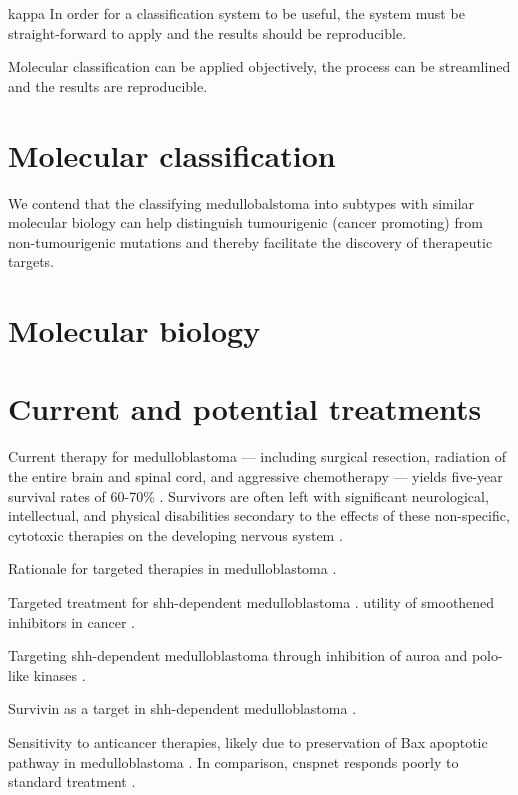 kappa
In order for a classification system to be useful, the system must be straight-forward to apply and the results should be reproducible.

Molecular classification can be applied objectively, the process can be streamlined and the results are reproducible.

\section{Molecular classification}

We contend that the classifying medullobalstoma into subtypes with similar molecular biology can help distinguish tumourigenic (cancer promoting) from non-tumourigenic mutations and thereby facilitate the discovery of therapeutic targets. 

\section{Molecular biology}


\section{Current and potential treatments}

Current therapy for medulloblastoma --- including surgical resection, radiation of the entire brain and spinal cord, and aggressive chemotherapy --- yields five-year survival rates of 60-70\% . Survivors are often left with significant neurological, intellectual, and physical disabilities secondary to the effects of these non-specific, cytotoxic therapies on the developing nervous system .

Rationale for targeted therapies in medulloblastoma .

Targeted treatment for \gls{shh}-dependent medulloblastoma .
utility of smoothened inhibitors in cancer .

Targeting \gls{shh}-dependent medulloblastoma through inhibition of auroa and polo-like kinases .

Survivin as a target in \gls{shh}-dependent medulloblastoma .

Sensitivity to anticancer therapies, likely due to preservation of Bax apoptotic pathway in medulloblastoma .
In comparison, \gls{cnspnet} responds poorly to standard treatment .

